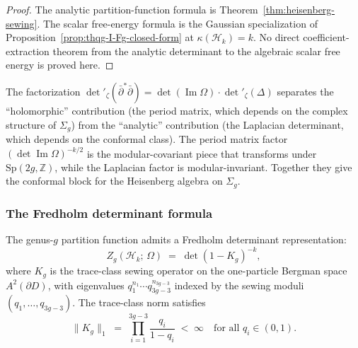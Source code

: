 \begin{proof}
The analytic partition-function formula is
Theorem~\ref{thm:heisenberg-sewing}. The scalar free-energy formula is
the Gaussian specialization of
Proposition~\ref{prop:thqg-I-Fg-closed-form} at
$\kappa(\mathcal{H}_k)=k$. No direct coefficient-extraction theorem
from the analytic determinant to the algebraic scalar free energy is
proved here.
\end{proof}

\begin{remark}
\label{rem:thqg-I-belavin-knizhnik}
The factorization $\det{}'_\zeta(\bar\partial^*\bar\partial) = \det(\operatorname{Im}\Omega) \cdot \det{}'_\zeta(\Delta)$ separates the ``holomorphic'' contribution (the period matrix, which depends on the complex structure of $\Sigma_g$) from the ``analytic'' contribution (the Laplacian determinant, which depends on the conformal class). The period matrix factor $(\det\operatorname{Im}\Omega)^{-k/2}$ is the modular-covariant piece that transforms under $\mathrm{Sp}(2g,\mathbb{Z})$, while the Laplacian factor is modular-invariant. Together they give the conformal block for the Heisenberg algebra on $\Sigma_g$.
\end{remark}

\subsubsection{The Fredholm determinant formula}

\begin{proposition}
\label{prop:thqg-I-fredholm}
The genus-$g$ partition function admits a Fredholm determinant representation:
\begin{equation}\label{eq:thqg-I-fredholm-det}
Z_g(\mathcal{H}_k;\,\Omega) \;=\; \det(1 - K_g)^{-k},
\end{equation}
where $K_g$ is the trace-class sewing operator on the one-particle Bergman space $A^2(\partial D)$, with eigenvalues $q_1^{n_1} \cdots q_{3g-3}^{n_{3g-3}}$ indexed by the sewing moduli $(q_1, \ldots, q_{3g-3})$. The trace-class norm satisfies
\begin{equation}\label{eq:thqg-I-Kg-trace-norm}
\|K_g\|_1 \;=\; \prod_{i=1}^{3g-3} \frac{q_i}{1-q_i} \;<\; \infty \quad\text{for all } q_i \in (0,1).
\end{equation}
\end{proposition}

